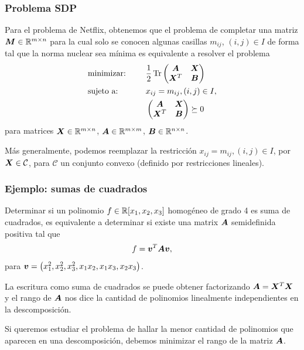\documentclass[aspectratio=169,12pt,spanish]{beamer}
\begin{document}
\begin{frame}
\frametitle{Problema SDP}

Para el problema de Netflix, obtenemos que el problema de completar una matriz $\bm{M} \in \mathbb{R}^{m \times n}$ para la cual solo se conocen algunas casillas $m_{ij}$, $(i,j) \in I$ de forma tal que la norma nuclear sea mínima es equivalente a resolver el problema
\begin{alignat*}{2}
  & \text{minimizar: } & & \frac{1}{2}\operatorname{Tr} \begin{pmatrix} \bm{A} & \bm{X} \\ \bm{X}^T & \bm{B} \end{pmatrix} \\
   & \text{sujeto a: } & \quad & x_{ij} = m_{ij}, (i, j) \in I, \\
   &&& \begin{pmatrix} \bm{A} & \bm{X} \\ \bm{X}^T & \bm{B} \end{pmatrix}   \succeq 0
\end{alignat*}
para matrices $\bm{X} \in \mathbb{R}^{m \times n}$, $\bm{A} \in \mathbb{R}^{m \times m}$, $\bm{B} \in \mathbb{R}^{n \times n}$.

Más generalmente, podemos reemplazar la restricción $x_{ij} = m_{ij}, (i, j) \in I$, por $\bm{X}  \in \mathcal{C}$, para $\mathcal{C}$ un conjunto convexo (definido por restricciones lineales).
\end{frame}


\begin{frame}
\frametitle{Ejemplo: sumas de cuadrados}

Determinar si un polinomio $f \in \mathbb{R}[x_1, x_2, x_3]$ homogéneo de grado 4 es suma de cuadrados, es equivalente a determinar si existe una matrix $\bm{A}$ semidefinida positiva tal que
$$
f = \bm{v}^T  \bm{A} \bm{v},
$$
para $\bm{v} = \begin{pmatrix} x_1^2, x_2^2, x_3^2, x_1 x_2, x_1 x_3, x_2 x_3 \end{pmatrix}$.

La escritura como suma de cuadrados se puede obtener factorizando $\bm{A} = \bm{X}^T \bm{X}$ y el rango de $\bm{A}$ nos dice la cantidad de polinomios linealmente independientes en la descomposición.

Si queremos estudiar el problema de hallar la menor cantidad de polinomios que aparecen en una descomposición, debemos minimizar el rango de la matriz $\bm{A}$.

\end{frame}
\end{document}
